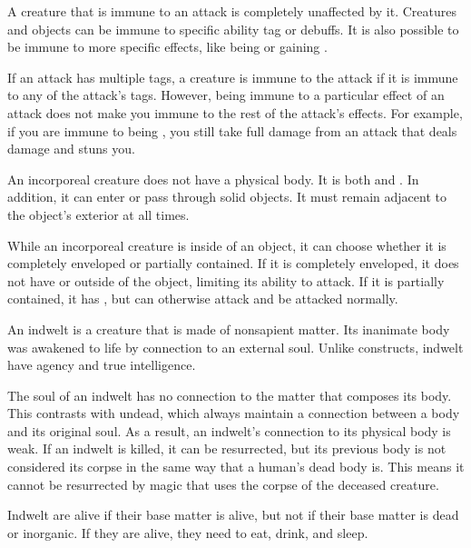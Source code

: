   A creature that is immune to an attack is completely unaffected by it.
  Creatures and objects can be immune to specific ability tag or debuffs.
  It is also possible to be immune to more specific effects, like being \grappled or gaining .

  If an attack has multiple tags, a creature is immune to the attack if it is immune to any of the attack's tags.
  However, being immune to a particular effect of an attack does not make you immune to the rest of the attack's effects.
  For example, if you are immune to being \stunned, you still take full damage from an attack that deals damage and stuns you.

  An incorporeal creature does not have a physical body.
  It is both  and .
  In addition, it can enter or pass through solid objects.
  It must remain adjacent to the object's exterior at all times.

  While an incorporeal creature is inside of an object, it can choose whether it is completely enveloped or partially contained.
  If it is completely enveloped, it does not have  or  outside of the object, limiting its ability to attack.
  If it is partially contained, it has , but can otherwise attack and be attacked normally.

  An indwelt is a creature that is made of nonsapient matter.
  Its inanimate body was awakened to life by connection to an external soul.
  Unlike constructs, indwelt have agency and true intelligence.

  The soul of an indwelt has no connection to the matter that composes its body.
  This contrasts with undead, which always maintain a connection between a body and its original soul.
  As a result, an indwelt's connection to its physical body is weak.
  If an indwelt is killed, it can be resurrected, but its previous body is not considered its corpse in the same way that a human's dead body is.
  This means it cannot be resurrected by magic that uses the corpse of the deceased creature.

  Indwelt are alive if their base matter is alive, but not if their base matter is dead or inorganic.
  If they are alive, they need to eat, drink, and sleep.

